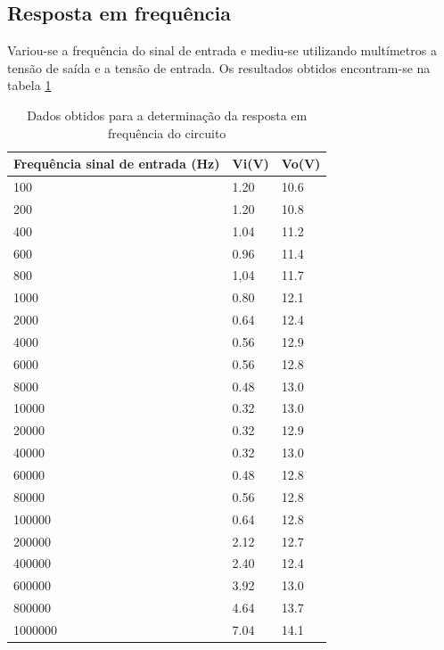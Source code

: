\documentclass[%
  reprint,
  nofootinbib,
  amsmath,amssymb,
  aps,
  10pt,
  a4paper
]{revtex4-1}
\begin{document}
\subsection{Resposta em frequência}
Variou-se a frequência do sinal de entrada e mediu-se utilizando multímetros a tensão de saída e a tensão de entrada. Os resultados obtidos encontram-se na tabela \ref{tab:respostafrequenciaresultados}
\begin{table}[h]
    \begin{tabular}{|l|l|l|}
    \hline
    Frequência sinal de entrada (Hz) & Vi(V) & Vo(V) \\ \hline
    100                              & 1.20  & 10.6  \\ \hline
    200                              & 1.20  & 10.8  \\ \hline
    400                              & 1.04  & 11.2  \\ \hline
    600                              & 0.96  & 11.4  \\ \hline
    800                              & 1,04  & 11.7  \\ \hline
    1000                             & 0.80  & 12.1  \\ \hline
    2000                             & 0.64  & 12.4  \\ \hline
    4000                             & 0.56  & 12.9  \\ \hline
    6000                             & 0.56  & 12.8  \\ \hline
    8000                             & 0.48  & 13.0  \\ \hline
    10000                            & 0.32  & 13.0  \\ \hline
    20000                            & 0.32  & 12.9  \\ \hline
    40000                            & 0.32  & 13.0  \\ \hline
    60000                            & 0.48  & 12.8  \\ \hline
    80000                            & 0.56  & 12.8  \\ \hline
    100000                           & 0.64  & 12.8  \\ \hline
    200000                           & 2.12  & 12.7  \\ \hline
    400000                           & 2.40  & 12.4  \\ \hline
    600000                           & 3.92  & 13.0  \\ \hline
    800000                           & 4.64  & 13.7  \\ \hline
    1000000                          & 7.04  & 14.1  \\ \hline
    \end{tabular}
\caption{Dados obtidos para a determinação da resposta em frequência do circuito}
\label{tab:respostafrequenciaresultados}
\end{table}
\end{document}
